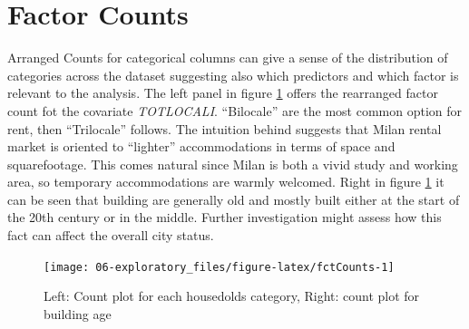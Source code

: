 \documentclass[
  12pt,
  a4paper,
  oneside]{book}
\theoremstyle{definition}
\theoremstyle{definition}
\theoremstyle{definition}
\theoremstyle{remark}
\begin{document}
\hypertarget{factor-counts}{%
\section{Factor Counts}\label{factor-counts}}

Arranged Counts for categorical columns can give a sense of the distribution of categories across the dataset suggesting also which predictors and which factor is relevant to the analysis. The left panel in figure \ref{fig:fctCounts} offers the rearranged factor count fot the covariate \emph{TOTLOCALI}. ``Bilocale'' are the most common option for rent, then ``Trilocale'' follows. The intuition behind suggests that Milan rental market is oriented to ``lighter'' accommodations in terms of space and squarefootage. This comes natural since Milan is both a vivid study and working area, so temporary accommodations are warmly welcomed. Right in figure \ref{fig:fctCounts} it can be seen that building are generally old and mostly built either at the start of the 20th century or in the middle. Further investigation might assess how this fact can affect the overall city status.

\begin{figure}

{\centering \texttt{[image: 06-exploratory\_files/figure-latex/fctCounts-1]} 

}

\caption{Left: Count plot for each housedolds category, Right: count plot for building age}\label{fig:fctCounts}
\end{figure}
\end{document}
